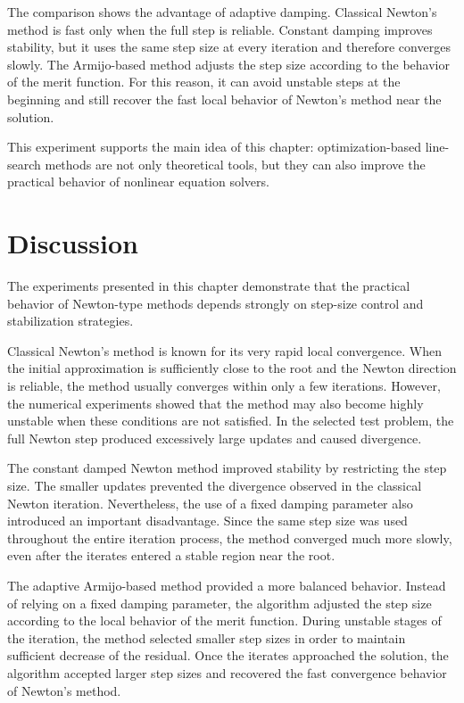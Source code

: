 The comparison shows the advantage of adaptive damping. Classical Newton's method is fast only when the full step is reliable. Constant damping improves stability, but it uses the same step size at every iteration and therefore converges slowly. The Armijo-based method adjusts the step size according to the behavior of the merit function. For this reason, it can avoid unstable steps at the beginning and still recover the fast local behavior of Newton's method near the solution.

This experiment supports the main idea of this chapter: optimization-based line-search methods are not only theoretical tools, but they can also improve the practical behavior of nonlinear equation solvers.

\section{Discussion}

The experiments presented in this chapter demonstrate that the practical behavior of Newton-type methods depends strongly on step-size control and stabilization strategies.

Classical Newton's method is known for its very rapid local convergence. When the initial approximation is sufficiently close to the root and the Newton direction is reliable, the method usually converges within only a few iterations. However, the numerical experiments showed that the method may also become highly unstable when these conditions are not satisfied. In the selected test problem, the full Newton step produced excessively large updates and caused divergence.

The constant damped Newton method improved stability by restricting the step size. The smaller updates prevented the divergence observed in the classical Newton iteration. Nevertheless, the use of a fixed damping parameter also introduced an important disadvantage. Since the same step size was used throughout the entire iteration process, the method converged much more slowly, even after the iterates entered a stable region near the root.

The adaptive Armijo-based method provided a more balanced behavior. Instead of relying on a fixed damping parameter, the algorithm adjusted the step size according to the local behavior of the merit function. During unstable stages of the iteration, the method selected smaller step sizes in order to maintain sufficient decrease of the residual. Once the iterates approached the solution, the algorithm accepted larger step sizes and recovered the fast convergence behavior of Newton's method.

